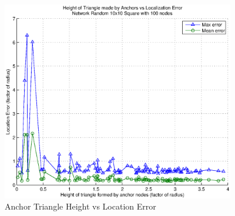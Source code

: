 \begin{figure}
  \centering
    \includegraphics[width=4in]{figures/AnchorTriangleHeightVsError-Random-10x10-Square-with-100-nodes.eps}
    \caption{Anchor Triangle Height vs Location Error}
    \label{fig:Height1}
\end{figure}

